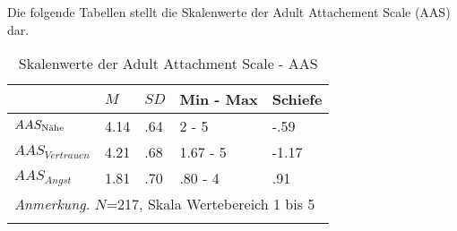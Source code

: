 Die folgende Tabellen stellt die Skalenwerte der Adult Attachement Scale (AAS) dar.

\begin{table}[ht]
\begin{tabular}{m{6em} m{3em}  m{3em}  m{5em} m{3em}} 
  \hline
  & $M$ & $SD$ & Min - Max & Schiefe\\
  \hline
  $AAS_{\textnormal{Nähe}}$ & 4.14 & .64 & 2 - 5 & -.59\\
  $AAS_{Vertrauen}$ & 4.21 & .68 & 1.67 - 5 & -1.17\\
  $AAS_{Angst}$ & 1.81 & .70 & .80 - 4 & .91 \\
  \hline
  \multicolumn{5}{l}{\textit{Anmerkung.} $N$=217, Skala Wertebereich 1 bis 5}\\
  &&&&\\
\end{tabular}
\caption{Skalenwerte der Adult Attachment Scale - AAS}
\label{table:AppAASDeskriptiv}
\end{table}
